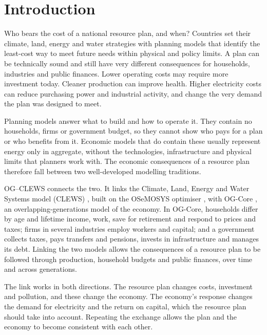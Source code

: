 \section{Introduction}
\label{sec:intro}

Who bears the cost of a national resource plan, and when? Countries set their climate,
land, energy and water strategies with planning models that identify the least-cost way
to meet future needs within physical and policy limits. A plan can be technically sound
and still have very different consequences for households, industries and public
finances. Lower operating costs may require more investment today. Cleaner production
can improve health. Higher electricity costs can reduce purchasing power and industrial
activity, and change the very demand the plan was designed to meet.

Planning models answer what to build and how to operate it. They contain no households,
firms or government budget, so they cannot show who pays for a plan or who benefits from
it. Economic models that do contain these usually represent energy only in aggregate,
without the technologies, infrastructure and physical limits that planners work with.
The economic consequences of a resource plan therefore fall between two well-developed
modelling traditions.

OG--CLEWS connects the two. It links the Climate, Land, Energy and Water Systems model
(CLEWS) \citep{howells_clews_2013}, built on the OSeMOSYS optimiser
\citep{howells_osemosys_2011}, with OG-Core \citep{debacker_evans_ogcore}, an
overlapping-generations model of the economy. In OG-Core, households differ by age and
lifetime income, work, save for retirement and respond to prices and taxes; firms in
several industries employ workers and capital; and a government collects taxes, pays
transfers and pensions, invests in infrastructure and manages its debt. Linking the two
models allows the consequences of a resource plan to be followed through production,
household budgets and public finances, over time and across generations.

The link works in both directions. The resource plan changes costs, investment and
pollution, and these change the economy. The economy's response changes the demand for
electricity and the return on capital, which the resource plan should take into account.
Repeating the exchange allows the plan and the economy to become consistent with each
other.

